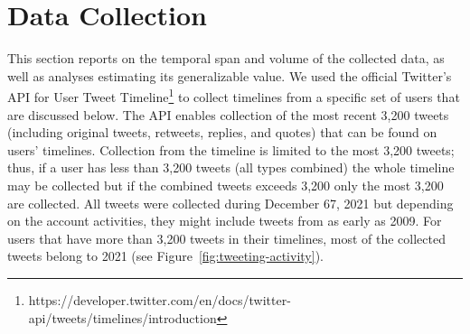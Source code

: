 \documentclass[letterpaper]{article} %
\begin{document}
\section{Data Collection}

This section reports on the temporal span and volume of the collected data, as well as analyses estimating its generalizable value. 
We used the official Twitter's API for User Tweet Timeline\footnote{https://developer.twitter.com/en/docs/twitter-api/tweets/timelines/introduction} to collect timelines from a specific set of users that are discussed below. The API enables collection of the most recent 3,200 tweets (including original tweets, retweets, replies, and quotes) that can be found on users' timelines. Collection from the timeline is limited to the most 3,200 tweets; thus, if a user has less than 3,200 tweets (all types combined) the whole timeline may be collected but if the combined tweets exceeds 3,200 only the most 3,200 are collected.  All tweets were collected during December 67, 2021 but depending on the account activities, they might include tweets from as early as 2009. For   users that have  more than 3,200 tweets in their timelines, most of the collected tweets  belong to 2021 (see   Figure~\ref{fig:tweeting-activity}).



\end{document}
